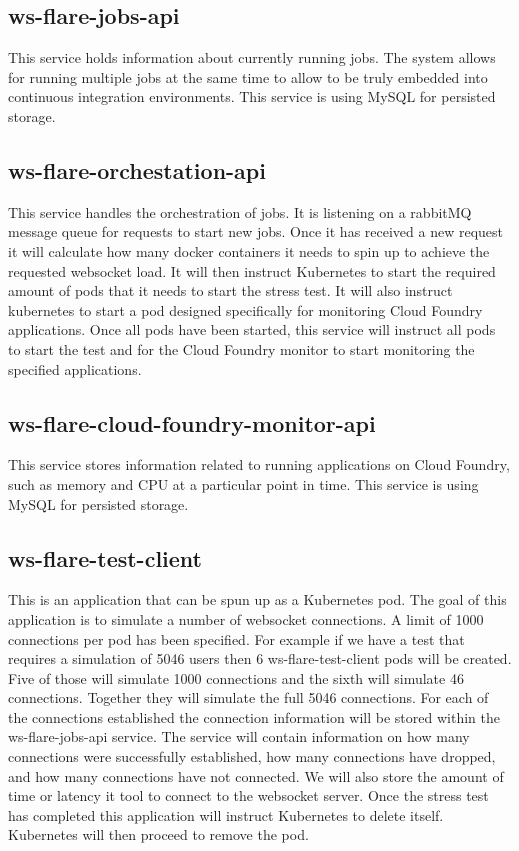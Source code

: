 \subsection{ws-flare-jobs-api}

This service holds information about currently running jobs. The system allows for running multiple jobs at the same time to allow to be truly embedded into continuous integration environments. This service is using MySQL for persisted storage. 

\subsection{ws-flare-orchestation-api}

This service handles the orchestration of jobs. It is listening on a rabbitMQ message queue for requests to start new jobs. Once it has received a new request it will calculate how many docker containers it needs to spin up to achieve the requested websocket load. It will then instruct Kubernetes to start the required amount of pods that it needs to start the stress test. It will also instruct kubernetes to start a pod designed specifically for monitoring Cloud Foundry applications. Once all pods have been started, this service will instruct all pods to start the test and for the Cloud Foundry monitor to start monitoring the specified applications.

\subsection{ws-flare-cloud-foundry-monitor-api}

This service stores information related to running applications on Cloud Foundry, such as memory and CPU at a particular point in time. This service is using MySQL for persisted storage. 

\subsection{ws-flare-test-client}

This is an application that can be spun up as a Kubernetes pod. The goal of this application is to simulate a number of websocket connections. A limit of 1000 connections per pod has been specified. For example if we have a test that requires a simulation of 5046 users then 6 ws-flare-test-client pods will be created. Five of those will simulate 1000 connections and the sixth will simulate 46 connections. Together they will simulate the full 5046 connections. For each of the connections established the connection information will be stored within the ws-flare-jobs-api service. The service will contain information on how many connections were successfully established, how many connections have dropped, and how many connections have not connected. We will also store the amount of time or latency it tool to connect to the websocket server. Once the stress test has completed this application will instruct Kubernetes to delete itself. Kubernetes will then proceed to remove the pod.

